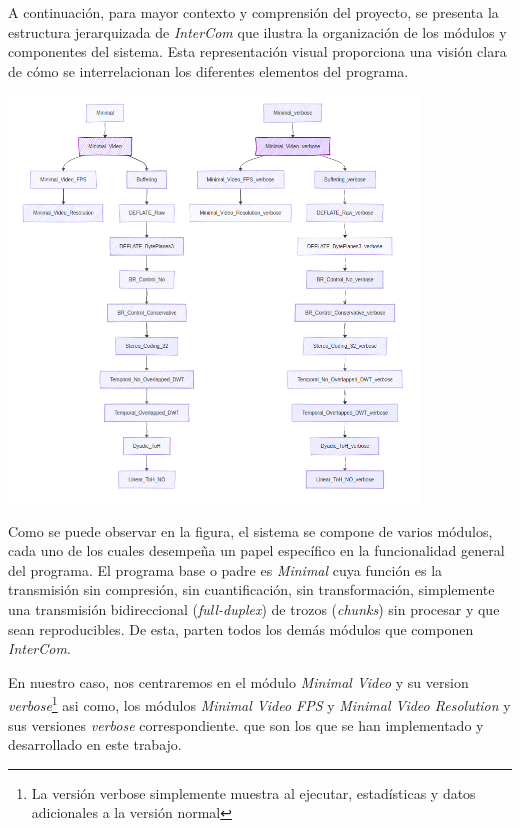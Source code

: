 A continuación, para mayor contexto y comprensión del proyecto, se presenta la estructura jerarquizada de \textit{InterCom} que ilustra la organización de los módulos y componentes del sistema. Esta representación visual proporciona una visión clara de cómo se interrelacionan los diferentes elementos del programa.
\begin{center}
	\includegraphics[width = 0.82\textwidth]{images/esquema_jerarquico.png}
	\label{fig:jeraquia}
\end{center}

\vspace{\baselineskip}
Como se puede observar en la figura, el sistema se compone de varios módulos, cada uno de los cuales desempeña un papel específico en la funcionalidad general del programa. El programa base o padre es \textit{Minimal} cuya función es la transmisión sin compresión, sin cuantificación, sin transformación, simplemente una transmisión bidireccional (\textit{full-duplex}) de trozos (\textit{chunks}) sin procesar y que sean reproducibles. De esta, parten todos los demás módulos que componen \textit{InterCom}. 

\vspace{\baselineskip}
En nuestro caso, nos centraremos en el módulo \textit{Minimal Video} y su version \textit{verbose}\footnote{La versión verbose simplemente muestra al ejecutar, estadísticas y datos adicionales a la versión normal} asi como, los módulos \textit{Minimal Video FPS} y \textit{Minimal Video Resolution} y sus versiones \textit{verbose} correspondiente. que son los que se han implementado y desarrollado en este trabajo.

